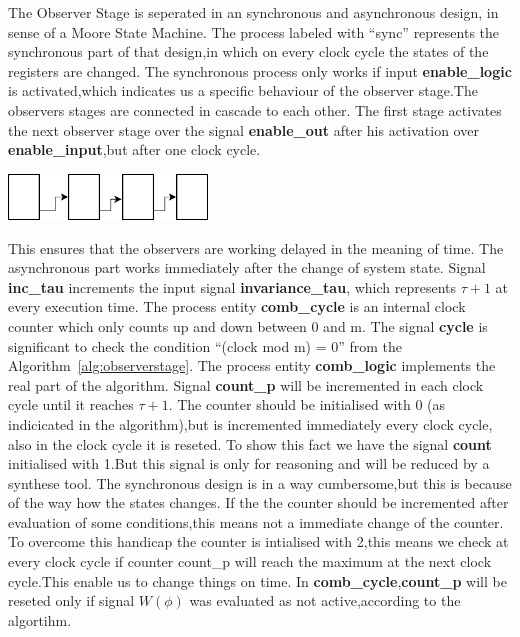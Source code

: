 The Observer Stage is seperated in an synchronous and asynchronous design, in sense of a Moore State Machine.
The process labeled with ``sync'' represents the synchronous part of that design,in which on every clock cycle 
the states of the registers are changed.
The synchronous process only works if input \textbf{enable\_logic} is activated,which indicates us a specific behaviour of the 
observer stage.The observers stages are connected in cascade to each other. The first stage activates the next observer stage over the signal
\textbf{enable\_out} after his activation over \textbf{enable\_input},but after one clock cycle.
%
\begin{center}
\includegraphics[width=200px]{Chapter2/Figs/Raster/Diagramm1.png}
\end{center}
This ensures that the observers are working delayed in the meaning of time.
The asynchronous part works immediately after the change of system state.  
Signal \textbf{inc\_tau} increments the input signal \textbf{invariance\_tau}, which represents $\tau+1$ at every execution time.
The process entity \textbf{comb\_cycle} is an internal clock counter which only counts up and down between 0 and m.
The signal \textbf{cycle} is significant to check the condition ``(clock mod m) = 0'' from the Algorithm~\ref{alg:observerstage}.
The process entity \textbf{comb\_logic} implements the real part of the algorithm.
Signal \textbf{count\_p} will be incremented in each clock cycle until it reaches $\tau+1$.
The counter should be initialised with 0 (as indicicated in the algorithm),but is incremented immediately every clock cycle, also in the clock cycle it is reseted.
To show this fact we have the signal \textbf{count} initialised with 1.But this signal is only for reasoning and will be reduced by a synthese tool.  
The synchronous design is in a way cumbersome,but this is because of the way how the states changes.
If the the counter should be incremented after evaluation of some conditions,this means not a immediate change of the counter.
To overcome this handicap the counter is intialised with 2,this means we check at every clock cycle if counter count\_p will reach the maximum
at the next clock cycle.This enable us to change things on time. 
In \textbf{comb\_cycle},\textbf{count\_p} will be reseted only if signal $W(\phi)$ was evaluated as not active,according to the algortihm.
